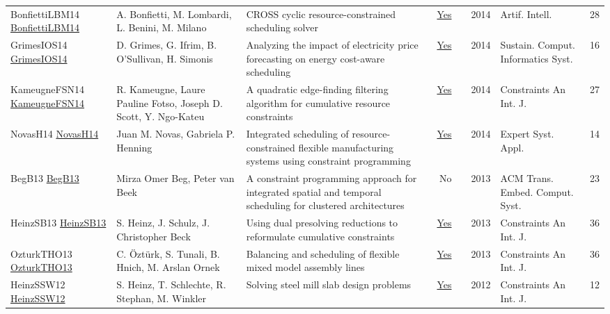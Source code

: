 {\begin{longtable}{p{3cm}p{6cm}p{7cm}rrrp{3cm}r}
BonfiettiLBM14 \href{https://doi.org/10.1016/j.artint.2013.09.006}{BonfiettiLBM14} & A. Bonfietti, M. Lombardi, L. Benini, M. Milano & {CROSS} cyclic resource-constrained scheduling solver & \href{articles/BonfiettiLBM14.pdf}{Yes} & \cite{BonfiettiLBM14} & 2014 & Artif. Intell. & 28\\
GrimesIOS14 \href{https://doi.org/10.1016/j.suscom.2014.08.009}{GrimesIOS14} & D. Grimes, G. Ifrim, B. O'Sullivan, H. Simonis & Analyzing the impact of electricity price forecasting on energy cost-aware scheduling & \href{articles/GrimesIOS14.pdf}{Yes} & \cite{GrimesIOS14} & 2014 & Sustain. Comput. Informatics Syst. & 16\\
KameugneFSN14 \href{https://doi.org/10.1007/s10601-013-9157-z}{KameugneFSN14} & R. Kameugne, Laure Pauline Fotso, Joseph D. Scott, Y. Ngo{-}Kateu & A quadratic edge-finding filtering algorithm for cumulative resource constraints & \href{articles/KameugneFSN14.pdf}{Yes} & \cite{KameugneFSN14} & 2014 & Constraints An Int. J. & 27\\
NovasH14 \href{https://doi.org/10.1016/j.eswa.2013.09.026}{NovasH14} & Juan M. Novas, Gabriela P. Henning & Integrated scheduling of resource-constrained flexible manufacturing systems using constraint programming & \href{articles/NovasH14.pdf}{Yes} & \cite{NovasH14} & 2014 & Expert Syst. Appl. & 14\\
BegB13 \href{http://doi.acm.org/10.1145/2512470}{BegB13} & Mirza Omer Beg, Peter van Beek & A constraint programming approach for integrated spatial and temporal scheduling for clustered architectures & No & \cite{BegB13} & 2013 & {ACM} Trans. Embed. Comput. Syst. & 23\\
HeinzSB13 \href{https://doi.org/10.1007/s10601-012-9136-9}{HeinzSB13} & S. Heinz, J. Schulz, J. Christopher Beck & Using dual presolving reductions to reformulate cumulative constraints & \href{articles/HeinzSB13.pdf}{Yes} & \cite{HeinzSB13} & 2013 & Constraints An Int. J. & 36\\
OzturkTHO13 \href{https://doi.org/10.1007/s10601-013-9142-6}{OzturkTHO13} & C. {\"{O}}zt{\"{u}}rk, S. Tunali, B. Hnich, M. Arslan Ornek & Balancing and scheduling of flexible mixed model assembly lines & \href{articles/OzturkTHO13.pdf}{Yes} & \cite{OzturkTHO13} & 2013 & Constraints An Int. J. & 36\\
HeinzSSW12 \href{https://doi.org/10.1007/s10601-011-9113-8}{HeinzSSW12} & S. Heinz, T. Schlechte, R. Stephan, M. Winkler & Solving steel mill slab design problems & \href{articles/HeinzSSW12.pdf}{Yes} & \cite{HeinzSSW12} & 2012 & Constraints An Int. J. & 12\\

\end{longtable}}
